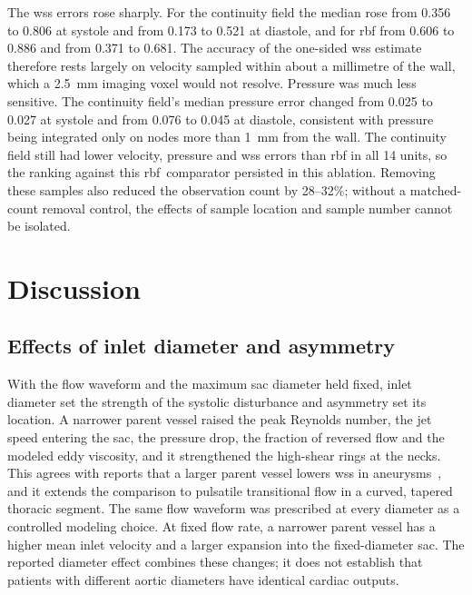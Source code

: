\documentclass[12pt,a4paper]{article}
\newcommand{\cfdrevision}[1]{#1} %
\newcommand{\WSS}{\ac{wss}\xspace}
\newcommand{\RBF}{\ac{rbf}\xspace}
\theoremstyle{definition}
\numberwithin{equation}{section}
\providecommand{\DIFaddtex}[1]{{\protect\color{blue} \sf #1}} %
\providecommand{\DIFdeltex}[1]{{\protect\color{red} \scriptsize #1}} %
\providecommand{\DIFaddbegin}{} %
\providecommand{\DIFaddend}{} %
\providecommand{\DIFdelbegin}{} %
\providecommand{\DIFdelend}{} %
\providecommand{\DIFadd}[1]{\texorpdfstring{\DIFaddtex{#1}}{#1}} %
\providecommand{\DIFdel}[1]{\texorpdfstring{\DIFdeltex{#1}}{}} %
\newcommand{\DIFscaledelfig}{0.5}
\newlength{\DIFdelgraphicswidth} %
\newlength{\DIFdelgraphicsheight} %
\newcommand{\DIFaddincludegraphics}[2][]{{\color{blue}\fbox{\DIFOincludegraphics[#1]{#2}}}} %
\newcommand{\DIFdelincludegraphics}[2][]{%
\sbox{\DIFdelgraphicsbox}{\DIFOincludegraphics[#1]{#2}}%
\settoboxwidth{\DIFdelgraphicswidth}{\DIFdelgraphicsbox} %
\settoboxtotalheight{\DIFdelgraphicsheight}{\DIFdelgraphicsbox} %
\scalebox{\DIFscaledelfig}{%
\parbox[b]{\DIFdelgraphicswidth}{\usebox{\DIFdelgraphicsbox}\\[-\baselineskip] \rule{\DIFdelgraphicswidth}{0em}}\llap{\resizebox{\DIFdelgraphicswidth}{\DIFdelgraphicsheight}{%
\setlength{\unitlength}{\DIFdelgraphicswidth}%
\begin{picture}(1,1)%
\thicklines\linethickness{2pt} %
{\color[rgb]{1,0,0}\put(0,0){\framebox(1,1){}}}%
{\color[rgb]{1,0,0}\put(0,0){\line( 1,1){1}}}%
{\color[rgb]{1,0,0}\put(0,1){\line(1,-1){1}}}%
\end{picture}%
}\hspace*{3pt}}} %
} %
\DeclareRobustCommand{\DIFaddbegin}{\DIFOaddbegin \let\includegraphics\DIFaddincludegraphics} %
\DeclareRobustCommand{\DIFaddend}{\DIFOaddend \let\includegraphics\DIFOincludegraphics} %
\DeclareRobustCommand{\DIFdelbegin}{\DIFOdelbegin \let\includegraphics\DIFdelincludegraphics} %
\DeclareRobustCommand{\DIFdelend}{\DIFOaddend \let\includegraphics\DIFOincludegraphics} %
\renewcommand{\DIFaddtex}[1]{{\protect\color{red}#1}}
\renewcommand{\DIFdeltex}[1]{}
\renewcommand{\DIFdel}[1]{}
\renewcommand{\DIFaddincludegraphics}[2][]{\DIFOincludegraphics[#1]{#2}}
\renewcommand{\DIFdelincludegraphics}[2][]{}
\renewcommand{\cfdrevision}[1]{\textcolor{red}{#1}}
\def\DIFaddbegin{}\def\DIFaddend{}%
\def\DIFdelbegin{}\def\DIFdelend{}%
\def\cfdrevision#1{#1}%
\begin{document}
The \WSS errors rose sharply. For the continuity field the median rose from 0.356 to 0.806 at systole and from 0.173 to 0.521 at diastole, and for \RBF from 0.606 to 0.886 and from 0.371 to 0.681. The accuracy of the one-sided \WSS estimate therefore rests largely on velocity sampled within about a millimetre of the wall, which a 2.5~mm imaging voxel would not resolve. Pressure was much less sensitive. The continuity field's median pressure error changed from 0.025 to 0.027 at systole and from 0.076 to 0.045 at diastole, consistent with pressure being integrated only on nodes more than 1~mm from the wall. The continuity field still had lower velocity, pressure and \WSS errors than \RBF in all 14 units, so the \DIFdelbegin \DIFdel{comparison between the methods does not depend on the near-wall samples , whereas the absolute }%
\DIFdel{accuracy does}\DIFdelend \DIFaddbegin \DIFadd{ranking against this }\RBF{}\ \DIFadd{comparator persisted in this ablation. Removing these samples also reduced the observation count by 28--32\%; without a matched-count removal control, the effects of sample location and sample number cannot be isolated}\DIFaddend .




\section{Discussion}
\label{sec:discussion}
\subsection{Effects of inlet diameter and asymmetry}
With the flow waveform and the maximum sac diameter held fixed, inlet diameter set the strength of the systolic disturbance and asymmetry set its location. A narrower parent vessel raised the peak Reynolds number, the jet speed entering the sac, the pressure drop, the fraction of reversed flow and the modeled eddy viscosity, and it strengthened the high-shear rings at the necks. This agrees with reports that a larger parent vessel lowers \WSS in aneurysms~\cite{fattahi2023influence}, and it extends the comparison to pulsatile transitional flow in a curved, tapered thoracic segment. \DIFdelbegin \DIFdel{The same flow rate was prescribed at every diameter because cardiac output is not altered by the calibre of the parent vessel: a patient with a narrower descending aorta delivers the same stroke volume through a smaller lumen. The diameter effect reported here therefore comprises both the geometric expansion into the sac and the accompanying rise in mean velocity, which is how the two act together in vivo.
}\DIFdelend \DIFaddbegin \DIFadd{\cfdrevision{The same flow waveform was prescribed at every diameter as a controlled modeling choice. At fixed flow rate, a narrower parent vessel has a higher mean inlet velocity and a larger expansion into the fixed-diameter sac. The reported diameter effect combines these changes; it does not establish that patients with different aortic diameters have identical cardiac outputs.}
}\DIFaddend 
\end{document}
